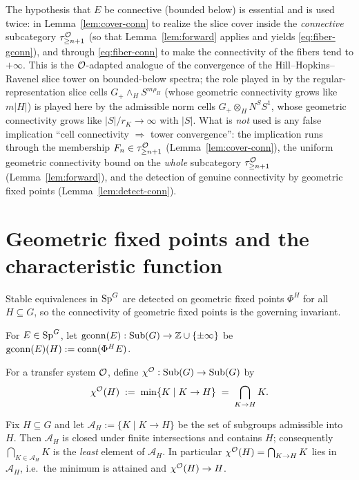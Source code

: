 \begin{qfiveremark}
The hypothesis that $E$ be connective (bounded below) is essential and is used
twice: in Lemma~\ref{lem:cover-conn} to realize the slice cover inside the
\emph{connective} subcategory $\tau^{\mathcal{O}}_{\ge n+1}$ (so that
Lemma~\ref{lem:forward} applies and yields \eqref{eq:fiber-gconn}), and through
\eqref{eq:fiber-conn} to make the connectivity of the fibers tend to $+\infty$.
This is the $\mathcal{O}$-adapted analogue of the convergence of the
Hill--Hopkins--Ravenel slice tower on bounded-below spectra; the role played in
\cite{HHR16} by the regular-representation slice cells
$G_+\wedge_H S^{m\rho_H}$ (whose geometric connectivity grows like $m|H|$) is
played here by the admissible norm cells $G_+\otimes_H N^S S^1$, whose geometric
connectivity grows like $|S|/r_K\to\infty$ with $|S|$. What is \emph{not} used
is any false implication ``cell connectivity $\Rightarrow$ tower convergence'':
the implication runs through the membership $F_n\in\tau^{\mathcal{O}}_{\ge n+1}$
(Lemma~\ref{lem:cover-conn}), the uniform geometric connectivity bound on the
\emph{whole} subcategory $\tau^{\mathcal{O}}_{\ge n+1}$ (Lemma~\ref{lem:forward}), and
the detection of genuine connectivity by geometric fixed points
(Lemma~\ref{lem:detect-conn}).
\end{qfiveremark}

\section*{Geometric fixed points and the characteristic function}

Stable equivalences in $\mathrm{Sp}^G$ are detected on geometric fixed points
$\Phi^H$ for all $H\subseteq G$, so the connectivity of geometric fixed points
is the governing invariant.

\begin{qfivedefinition}
For $E\in\mathrm{Sp}^G$, let $\operatorname{gconn}(E):\operatorname{Sub}(G)\to\mathbb{Z}\cup\{\pm\infty\}$ be
$\operatorname{gconn}(E)(H):=\operatorname{conn}(\Phi^H E)$.
\end{qfivedefinition}

\begin{qfivedefinition}
For a transfer system $\mathcal{O}$, define $\chi^{\mathcal{O}}:\operatorname{Sub}(G)\to\operatorname{Sub}(G)$ by
\[
\chi^{\mathcal{O}}(H)\;:=\;\min\{K\mid K\to H\}\;=\;\bigcap_{K\to H}K .
\]
\end{qfivedefinition}

\begin{qfivelemma}\label{lem:chi-min}
Fix $H\subseteq G$ and let $\mathcal A_H:=\{K\mid K\to H\}$ be the set of
subgroups admissible into $H$. Then $\mathcal A_H$ is closed under finite
intersections and contains $H$; consequently $\bigcap_{K\in\mathcal A_H}K$ is the
\emph{least} element of $\mathcal A_H$. In particular
$\chi^{\mathcal{O}}(H)=\bigcap_{K\to H}K$ lies in $\mathcal A_H$, i.e.\ the minimum is
attained and $\chi^{\mathcal{O}}(H)\to H$.
\end{qfivelemma}

